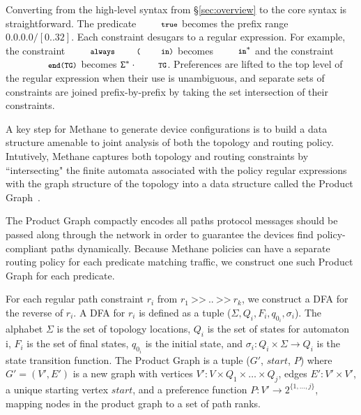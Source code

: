 \documentclass[numbers, 10pt, preprint]{sigplanconf}
\newcommand{\sysname}{{\small \sf Methane}\xspace}
\newcommand{\set}[1]{\ensuremath{\{ #1 \} }}
\newcommand{\CD}[1]{\texttt{\small #1}}  %
\newcommand{\KW}[1]{\texttt{\small\bfseries{#1}}}
\newcommand{\True}{\CD{true}}
\newcommand{\Prefer}{\texttt{>>}}
\newcommand{\Path}{\texttt{=>}}
\newcommand{\In}{\KW{in}}
\newcommand{\Exit}{\KW{exit}}
\newcommand{\End}{\KW{end}}
\newcommand{\Always}{\KW{always}}
\begin{document}
Converting from the high-level syntax from \S\ref{sec:overview} to the core syntax is straightforward. The predicate $\True$ becomes the prefix range $0.0.0.0/[0..32]$.
%
Each constraint desugars to a regular expression. For example, the constraint $\Always\CD{(\In)}$ becomes $\In^*$ and the constraint $\CD{\End(TG)}$ becomes $\mathtt{\Sigma}^* \cdot \CD{TG}$.
%
Preferences are lifted to the top level of the regular expression when their use is unambiguous, and separate sets of constraints are joined prefix-by-prefix by taking the set intersection of their constraints.

%
%

A key step for \sysname to generate device configurations is to build a data structure amenable to joint analysis of both the topology and routing policy. Intutively, \sysname captures both topology and routing constraints by ``intersecting" the finite automata associated with the policy regular expressions with the graph structure of the topology into a data structure called the Product Graph~\cite{propane}.

The Product Graph compactly encodes all paths protocol messages should be passed along through the network in order to guarantee the devices find policy-compliant paths dynamically.
%
%
Because \sysname policies can have a separate routing policy for each predicate matching traffic, we construct one such Product Graph for each predicate.


For each regular path constraint $r_i$ from $r_1 ~\Prefer~ .. ~\Prefer~ r_k$, we construct a DFA for the reverse of $r_i$. A DFA for $r_i$ is defined as a tuple ($\Sigma, Q_i, F_i, q_{0_i}, \sigma_i$). The alphabet $\Sigma$ is the set of topology locations, $Q_i$ is the set of states for automaton i, $F_i$ is the set of final states, $q_{0_i}$ is the initial state, and $\sigma_i \colon Q_i \times \Sigma \rightarrow Q_i$ is the state transition function.
%
The Product Graph is a tuple ($G'$, $start$, $P$) where $G' = (V',E')$ is a new graph with
vertices $V' \colon V \times Q_1 \times \dots \times Q_j$,
edges $E' \colon V' \times V'$,
a unique starting vertex $start$,
and a preference function $P \colon V' \rightarrow 2^{\set{1, \dots, j}}$, mapping nodes in the product graph to a set of path ranks.
\end{document}
